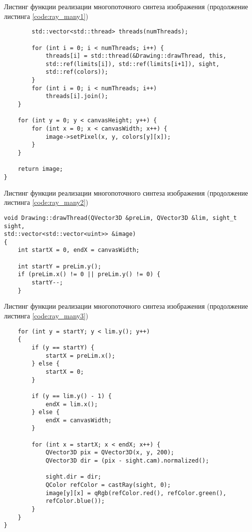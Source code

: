 \begin{code}
\caption{Листинг функции реализации многопоточного синтеза изображения (продолжение листинга \ref{code:ray_many1})}
\label{code:ray_many2}
\begin{verbatim}
        std::vector<std::thread> threads(numThreads);
        
        for (int i = 0; i < numThreads; i++) {
            threads[i] = std::thread(&Drawing::drawThread, this,
            std::ref(limits[i]), std::ref(limits[i+1]), sight, 
            std::ref(colors));
        }
        for (int i = 0; i < numThreads; i++)
            threads[i].join();
    }

    for (int y = 0; y < canvasHeight; y++) {
        for (int x = 0; x < canvasWidth; x++) {
            image->setPixel(x, y, colors[y][x]);
        }
    }

    return image;
}
\end{verbatim}
\end{code}

\begin{code}
\caption{Листинг функции реализации многопоточного синтеза изображения (продолжение листинга \ref{code:ray_many2})}
\label{code:ray_many3}
\begin{verbatim}
void Drawing::drawThread(QVector3D &preLim, QVector3D &lim, sight_t sight,
std::vector<std::vector<uint>> &image)
{
    int startX = 0, endX = canvasWidth;

    int startY = preLim.y();
    if (preLim.x() != 0 || preLim.y() != 0) {
        startY--;
    }
\end{verbatim}
\end{code}

\begin{code}
\caption{Листинг функции реализации многопоточного синтеза изображения (продолжение листинга \ref{code:ray_many3})}
\label{code:ray_many4}
\begin{verbatim}
    for (int y = startY; y < lim.y(); y++)
    {
        if (y == startY) {
            startX = preLim.x();
        } else {
            startX = 0;
        }

        if (y == lim.y() - 1) {
            endX = lim.x();
        } else {
            endX = canvasWidth;
        }

        for (int x = startX; x < endX; x++) {
            QVector3D pix = QVector3D(x, y, 200);
            QVector3D dir = (pix - sight.cam).normalized();

            sight.dir = dir;
            QColor refColor = castRay(sight, 0);
            image[y][x] = qRgb(refColor.red(), refColor.green(),
            refColor.blue());
        }
    }
}
\end{verbatim}
\end{code}

